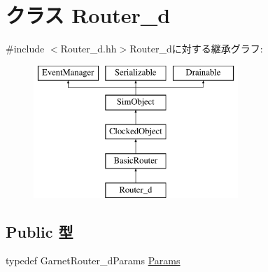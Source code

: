 \hypertarget{classRouter__d}{
\section{クラス Router\_\-d}
\label{classRouter__d}
}


{\ttfamily \#include $<$Router\_\-d.hh$>$}Router\_\-dに対する継承グラフ:\begin{figure}[H]
\begin{center}
\leavevmode
\includegraphics[height=5cm]{classRouter__d}
\end{center}
\end{figure}
\subsection*{Public 型}
\begin{DoxyCompactItemize}
\item 
typedef GarnetRouter\_\-dParams \hyperlink{classRouter__d_a0aa71fc14ebbcbd38c18c172bdbc48eb}{Params}
\end{DoxyCompactItemize}
